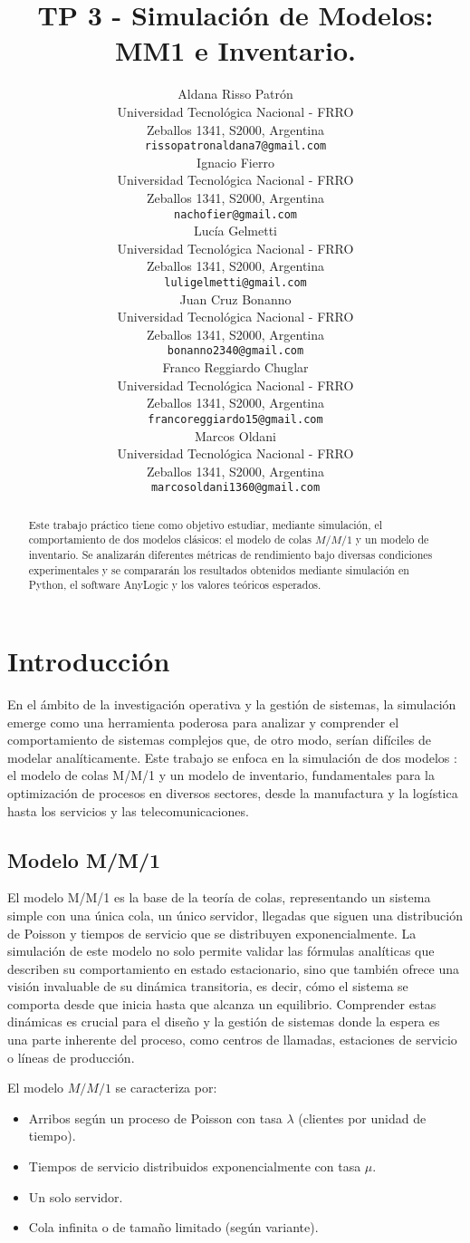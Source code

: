\documentclass{article}
\title{TP 3 - Simulación de Modelos: MM1 e Inventario.}
\author{
 Aldana Risso Patrón \\
  Universidad Tecnológica Nacional - FRRO \\
  Zeballos 1341, S2000, Argentina \\
  \texttt{rissopatronaldana7@gmail.com} \\
   \And
 Ignacio Fierro \\
  Universidad Tecnológica Nacional - FRRO \\
  Zeballos 1341, S2000, Argentina \\
  \texttt{nachofier@gmail.com} \\
  \And
 Lucía Gelmetti \\
  Universidad Tecnológica Nacional - FRRO \\
  Zeballos 1341, S2000, Argentina \\
  \texttt{luligelmetti@gmail.com} \\
  \And
 Juan Cruz Bonanno \\
  Universidad Tecnológica Nacional - FRRO \\
  Zeballos 1341, S2000, Argentina \\
  \texttt{bonanno2340@gmail.com} \\
  \And
 Franco Reggiardo Chuglar \\
  Universidad Tecnológica Nacional - FRRO\\
  Zeballos 1341, S2000, Argentina \\
  \texttt{francoreggiardo15@gmail.com} \\
  \And
 Marcos Oldani \\
  Universidad Tecnológica Nacional - FRRO \\
  Zeballos 1341, S2000, Argentina \\
  \texttt{marcosoldani1360@gmail.com} \\
}
\begin{document}
\maketitle
\begin{abstract}
Este trabajo práctico tiene como objetivo estudiar, mediante simulación, el comportamiento de dos modelos clásicos: el modelo de colas \( M/M/1 \) y un modelo de inventario. Se analizarán diferentes métricas de rendimiento bajo diversas condiciones experimentales y se compararán los resultados obtenidos mediante simulación en Python, el software AnyLogic y los valores teóricos esperados.
\end{abstract}

\section{Introducción}
En el ámbito de la investigación operativa y la gestión de sistemas, la simulación emerge como una herramienta poderosa para analizar y comprender el comportamiento de sistemas complejos que, de otro modo, serían difíciles de modelar analíticamente. Este trabajo se enfoca en la simulación de dos modelos : el modelo de colas M/M/1 y un modelo de inventario, fundamentales para la optimización de procesos en diversos sectores, desde la manufactura y la logística hasta los servicios y las telecomunicaciones.

\subsection{Modelo M/M/1}

El modelo M/M/1 es la base de la teoría de colas, representando un sistema simple con una única cola, un único servidor, llegadas que siguen una distribución de Poisson y tiempos de servicio que se distribuyen exponencialmente. La simulación de este modelo no solo permite validar las fórmulas analíticas que describen su comportamiento en estado estacionario, sino que también ofrece una visión invaluable de su dinámica transitoria, es decir, cómo el sistema se comporta desde que inicia hasta que alcanza un equilibrio. Comprender estas dinámicas es crucial para el diseño y la gestión de sistemas donde la espera es una parte inherente del proceso, como centros de llamadas, estaciones de servicio o líneas de producción.

El modelo \( M/M/1 \) se caracteriza por:

\begin{itemize}
    \item Arribos según un proceso de Poisson con tasa \( \lambda \) (clientes por unidad de tiempo).
    \item Tiempos de servicio distribuidos exponencialmente con tasa \( \mu \).
    \item Un solo servidor.
    \item Cola infinita o de tamaño limitado (según variante).
\end{itemize}
\end{document}

